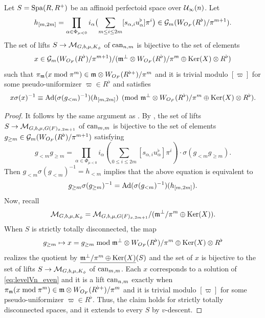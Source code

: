 \documentclass[12pt,reqno]{amsart}
\begin{document}
\begin{prop} \label{lem:levelVn_even}
    Let $S = {\operatorname{Spa}}(R,R^+)$ be an affinoid perfectoid space over ${\mathcal{U}}_\infty(n)$. Let
    \begin{equation} \label{eq:definition_h_m_2m}
        h_{[m, 2m]} =  \prod_{\alpha \in \Phi_{\mu<0}} i_\alpha\bigl(\sum_{m \leq i \leq 2m} [s_{\alpha,i}u_\alpha^\flat] \pi^i \bigr) \in {\mathcal{G}}_m(W_{O_F}(R^{\flat}) / \pi^{m + 1}). 
    \end{equation}
    The set of lifts $S \to {\mathcal{M}}_{G, b, \mu, K_\phi}$ of ${\operatorname{can}}_{n, m}$ is bijective to the set of elements
    \[
        x \in {\mathcal{G}}_m(W_{O_F}(R^\flat) / \pi^{m + 1}) / ({\mathfrak{m}}^\perp \otimes W_{O_F}(R^\flat) / \pi^m \oplus {\operatorname{Ker}}(X) \otimes R^{\flat})
    \]
    such that $\pi_{{\mathfrak{m}}}(x \bmod \pi^m) \in {\mathfrak{m}} \otimes W_{O_F}(R^{\flat+}) / \pi^{m}$ and it is trivial modulo $[\varpi]$ for some pseudo-uniformizer $\varpi \in R^\flat$ and satisfies
    \begin{equation} \label{eq:levelVn_even}
        x \sigma(x)^{-1} \equiv {\operatorname{Ad}}(\sigma(g_{<m})^{-1})(h_{[m, 2m]}) \pmod{{\mathfrak{m}}^\perp \otimes W_{O_F}(R^\flat) / \pi^m \oplus {\operatorname{Ker}}(X) \otimes R^{\flat}}. 
    \end{equation}
\end{prop}
\begin{proof}
    It follows by the same argument as . By , the set of lifts $S \to {\mathcal{M}}_{G, b, \mu, G(F)_{x, 2m + 1}}$ of ${\operatorname{can}}_{m, m}$ is bijective to the set of elements $g_{\geq m}\in {\mathcal{G}}_m(W_{O_F}(R^\flat)/\pi^{m+1})$ satisfying
    \[
        g_{<m} g_{\geq m} = \prod_{\alpha \in \Phi_{\mu<0}} i_\alpha\left(\sum_{0 \leq i \leq 2m} [s_{\alpha,i}u_\alpha^\flat]\pi^i\right) \cdot \sigma(g_{<m}g_{\geq m}). 
    \]
    Then $g_{<m} \sigma(g_{<m})^{-1} = h_{<m}$ implies that the above equation is equivalent to
    \[
        g_{\geq m} \sigma(g_{\geq m})^{-1} = {\operatorname{Ad}}(\sigma(g_{<m})^{-1})(h_{[m, 2m]}). 
    \]
    Now, recall  
    \[
        {\mathcal{M}}_{G, b, \mu, K_\phi} = {\mathcal{M}}_{G, b, \mu, G(F)_{x, 2m + 1}} / ({\mathfrak{m}}^\perp/\pi^m \oplus {\operatorname{Ker}}(X)). 
    \]
    When $S$ is strictly totally disconnected, the map
    \[
        g_{\geq m} \mapsto x = g_{\geq m} \bmod {\mathfrak{m}}^\perp \otimes W_{O_F}(R^\flat) / \pi^m \oplus {\operatorname{Ker}}(X) \otimes R^{\flat}
    \]
    realizes the quotient by $\underline{{\mathfrak{m}}^\perp/\pi^m \oplus {\operatorname{Ker}}(X)}(S)$ and the set of $x$ is bijective to the set of lifts $S \to {\mathcal{M}}_{G, b, \mu, K_\phi}$ of ${\operatorname{can}}_{m, m}$. Each $x$ corresponds to a solution of \eqref{eq:levelVn_even} and it is a lift ${\operatorname{can}}_{n, m}$ exactly when $\pi_{{\mathfrak{m}}}(x \bmod \pi^m) \in {\mathfrak{m}} \otimes W_{O_F}(R^{\flat+}) / \pi^{m}$ and it is trivial modulo $[\varpi]$ for some pseudo-uniformizer $\varpi \in R^\flat$. Thus, the claim holds for strictly totally disconnected spaces, and it extends to every $S$ by $v$-descent. 
\end{proof}
\end{document}
